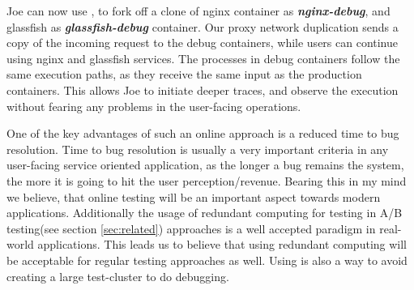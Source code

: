 Joe can now use \parikshan, to fork off a clone of nginx container as \textbf{\textit{nginx-debug}}, and glassfish as \textbf{\textit{glassfish-debug}} container. 
Our proxy network duplication sends a copy of the incoming request to the debug containers, while users can continue using nginx and glassfish services. 
The processes in debug containers follow the same execution paths, as they receive the same input as the production containers.
This allows Joe to initiate deeper traces, and observe the execution without fearing any problems in the user-facing operations.

One of the key advantages of such an online approach is a reduced time to bug resolution. 
Time to bug resolution is usually a very important criteria in any user-facing service oriented application, as the longer a bug remains the system, the more it is going to hit the user perception/revenue.
Bearing this in my mind we believe, that online testing will be an important aspect towards modern applications.
Additionally the usage of redundant computing for testing in A/B testing(see section \ref{sec:related}) approaches is a well accepted paradigm in real-world applications.
This leads us to believe that using redundant computing will be acceptable for regular testing approaches as well.
Using \parikshan is also a way to avoid creating a large test-cluster to do debugging. 

